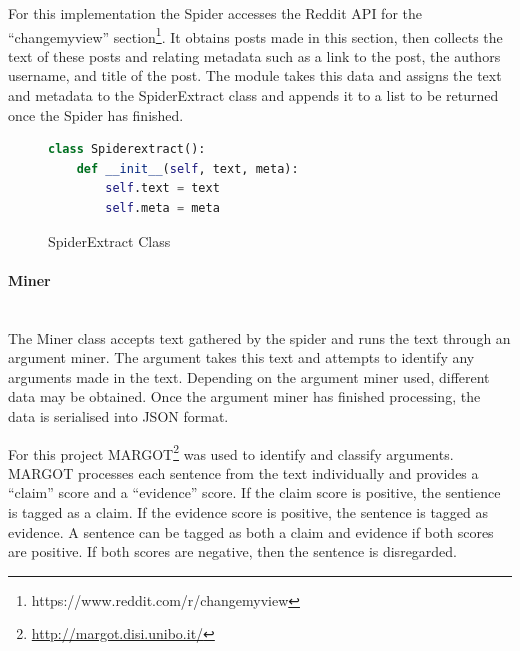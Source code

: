 \documentclass[12pt,a4paper]{article}
\begin{document}
For this implementation the Spider accesses the Reddit API for the ``changemyview'' section\footnote{https://www.reddit.com/r/changemyview}. It obtains posts made in this section, then collects the text of these posts and relating metadata such as a link to the post, the authors username, and title of the post. The module takes this data and assigns the text and metadata to the SpiderExtract class and appends it to a list to be returned once the Spider has finished. 

\begin{figure}[H]
    \centering
    \begin{lstlisting}[language=Python,firstnumber=1]
    class Spiderextract():
    def __init__(self, text, meta):
        self.text = text
        self.meta = meta
    \end{lstlisting}
    \caption{SpiderExtract Class}
    \label{fig:spiderextract}
\end{figure}

\paragraph{Miner}\mbox{}\\

The Miner class accepts text gathered by the spider and runs the text through an argument miner. The argument takes this text and attempts to identify any arguments made in the text. Depending on the argument miner used, different data may be obtained. Once the argument miner has finished processing, the data is serialised into JSON format.

For this project MARGOT\footnote{\url{http://margot.disi.unibo.it/}} was used to identify and classify arguments. MARGOT processes each sentence from the text individually and provides a ``claim'' score and a ``evidence'' score. If the claim score is positive, the sentience is tagged as a claim. If the evidence score is positive, the sentence is tagged as evidence. A sentence can be tagged as both a claim and evidence if both scores are positive. If both scores are negative, then the sentence is disregarded.
\end{document}
